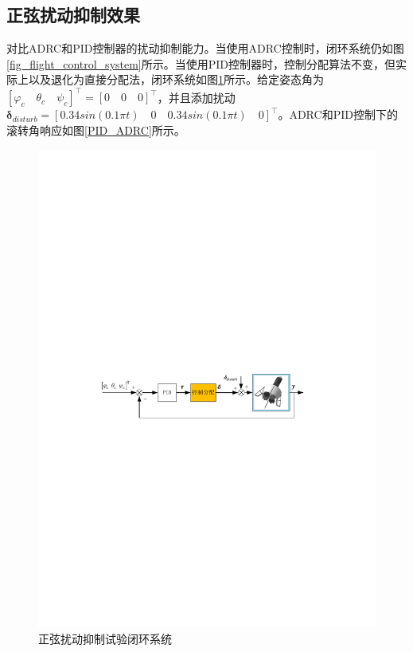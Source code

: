 \subsection{正弦扰动抑制效果}
对比ADRC和PID控制器的扰动抑制能力。当使用ADRC控制时，闭环系统仍如图\ref{fig_flight_control_system}所示。当使用PID控制器时，控制分配算法不变，但实际上以及退化为直接分配法，闭环系统如图\ref{allo_base_PID}所示。给定姿态角为$[\varphi_c \quad \theta_c \quad \psi_c]^\top=[0 \quad 0 \quad 0]^\top$，并且添加扰动$\bm{\delta }_{disturb}= [0.34sin(0.1\pi t) \quad 0 \quad 0.34sin(0.1\pi t) \quad 0]^\top $。ADRC和PID控制下的滚转角响应如图\ref{PID_ADRC}所示。
\begin{figure}[htbp]
	\centering	
	\includegraphics[scale=1]{Fig/allo_base_PID.pdf}
	\caption{\label{allo_base_PID}正弦扰动抑制试验闭环系统}
\end{figure}
